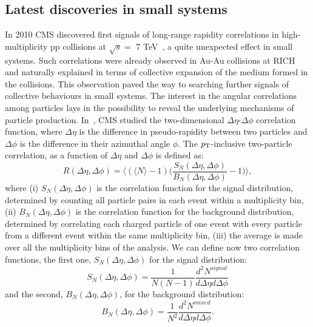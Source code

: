 \subsection{Latest discoveries in small systems}
In 2010 CMS discovered first signals of long-range rapidity correlations in 
high-multiplicity pp collisions at $\sqrt{s} = $ 7 TeV~\cite{Khachatryan:2010gv}, a quite unexpected effect 
in small systems. Such correlations
were already observed in Au-Au collisions at RICH~\cite{Alver:2008aa,Alver:2009id,Abelev:2009jv}
and naturally explained in terms of collective expansion of the medium formed in the collisions.
This observation paved the way to searching further signals of collective 
behaviours in small systems. 
The interest in the angular correlations among particles lays in the possibility 
to reveal the underlying mechanisms of particle production. In~\cite{Khachatryan:2010gv}, 
CMS studied the two-dimensional $\Delta \eta$-$\Delta \phi$ correlation 
function, where $\Delta \eta$ is the difference in pseudo-rapidity between 
two particles and $\Delta \phi$ is the difference in their azimuthal angle $\phi$. The $p_{\rm T}$-inclusive two-particle 
correlation, as a function of $\Delta \eta$ and $\Delta \phi$ is defined as:
\begin{equation}
\label{CorrelationFnc}
R(\Delta \eta,\Delta \phi) = \Big \langle (\langle N \rangle -1) \Big (\frac{S_N(\Delta \eta,\Delta \phi)}{B_N(\Delta \eta,\Delta \phi)} -1\Big )\Big \rangle,
\end{equation}
where (i) $S_N(\Delta \eta,\Delta \phi)$ is the correlation function for the signal distribution,
determined by counting all particle pairs in each event within a multiplicity bin, 
(ii) $B_N(\Delta \eta,\Delta \phi)$ is the correlation function for the background distribution, determined
  by correlating each charged particle of one event with every particle from 
a different event within the same multiplicity bin, (iii) the average is made over all the multiplicity bins of the analysis.
\iffalse
We can define now two correlation functions, the first one, $S_N(\Delta \eta,\Delta \phi)$ for the signal distribution:
\begin{equation}
\label{SignalDistribution}
S_N(\Delta \eta,\Delta \phi) = \frac{1}{N(N-1)}\frac{d^2N^{signal}}{d\Delta \eta d\Delta \phi}
\end{equation}
and the second, $B_N(\Delta \eta,\Delta \phi)$, for the background distribution:
\begin{equation}
\label{BkgDistribution}
B_N(\Delta \eta,\Delta \phi) = \frac{1}{N^2}\frac{d^2N^{mixed}}{d\Delta \eta d\Delta \phi}.
\end{equation}
